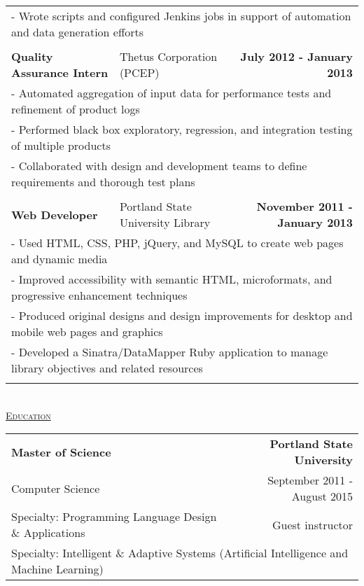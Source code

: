 \documentclass[letterpaper]{article}
\begin{document}
\begin{center}
\begin{tabular}{p{}p{}r}
			\\
				\multicolumn{3}{p{\textwidth}}{\quad\quad - Wrote scripts and configured Jenkins jobs in support of automation and data generation efforts} 
			\\
			\\
				\textbf{Quality Assurance Intern}					&
				Thetus Corporation (PCEP)							&
				\textbf{July 2012 - January 2013}
			\\
				\multicolumn{3}{p{\textwidth}}{\quad\quad - Automated aggregation of input data for performance tests and refinement of product logs}
			\\
				\multicolumn{3}{p{\textwidth}}{\quad\quad - Performed black box exploratory, regression, and integration testing of multiple products} 
			\\
				\multicolumn{3}{p{\textwidth}}{\quad\quad - Collaborated with design and development teams to define requirements and thorough test plans}
			\\
			\\
				\textbf{Web Developer}						&
				Portland State University Library					&
				\textbf{November 2011 - January 2013}
			\\
				\multicolumn{3}{p{\textwidth}}{\quad\quad - Used HTML, CSS, PHP, jQuery, and MySQL to create web pages and dynamic media} 
			\\
				\multicolumn{3}{p{\textwidth}}{\quad\quad - Improved accessibility with semantic HTML, microformats, and progressive enhancement techniques} 
			\\
				\multicolumn{3}{p{\textwidth}}{\quad\quad - Produced original designs and design improvements for desktop and mobile web pages and graphics} 
			\\
				\multicolumn{3}{p{\textwidth}}{\quad\quad - Developed a Sinatra/DataMapper Ruby application to manage library objectives and related resources} 
			\\
			\\
		\end{tabular}
        \\
		\underline{\large \scshape Education}
		\begin{tabular}{p{}r}
				\textbf{Master of Science}							&
				\textbf{Portland State University}
			\\
				Computer Science\quad				&
				September 2011 - August 2015
			\\
				Specialty: Programming Language Design \& Applications		&		Guest instructor
			\\	
				\multicolumn{2}{p{\textwidth}}{Specialty: Intelligent \& Adaptive Systems (Artificial Intelligence and Machine Learning)}
				

\end{tabular}
\end{center}
\end{document}
